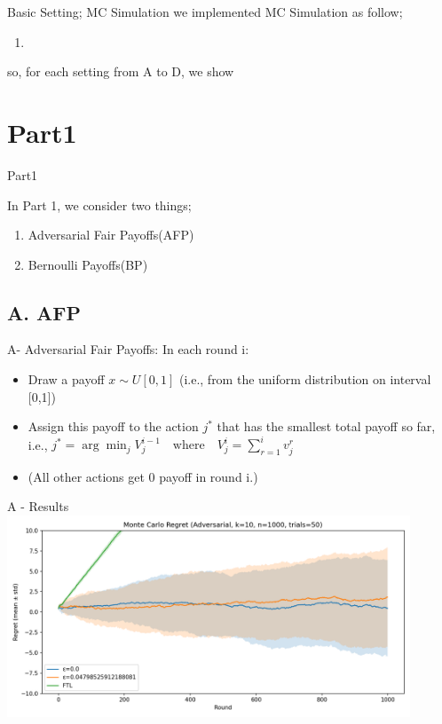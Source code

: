 \documentclass{beamer}
\begin{document}
\begin{frame}{Basic Setting; MC Simulation}
we implemented MC Simulation as follow;
\begin{enumerate}
    \item 
\end{enumerate}

so, for each setting from A to D, we show 

    
\end{frame}
\section{Part1}
\begin{frame}{Part1}

In Part 1, we consider two things;
\begin{enumerate}
    \item Adversarial Fair Payoffs(AFP) 
    \item Bernoulli Payoffs(BP)
\end{enumerate}
\end{frame}

\subsection{A. AFP}
\begin{frame}{A- Adversarial Fair Payoffs:}
   In each round i:
\begin{itemize}
    \item Draw a payoff $x \sim U[0,1]$ (i.e., from the uniform distribution on interval [0,1])
    \item Assign this payoff to the action $j^*$ that has the smallest total payoff so far,\\
    i.e., $j^* = \arg\min_j V^{i-1}_{j} \quad \text{where} \quad V^{i}_{j} = \sum_{r=1}^{i} v^{r}_{j}$
    \item (All other actions get 0 payoff in round i.)
\end{itemize} 


\end{frame}



\begin{frame}{A - Results}
\includegraphics[width=0.9\textwidth]{figures/adv_mc_regret.png}

\end{frame}
\end{document}
